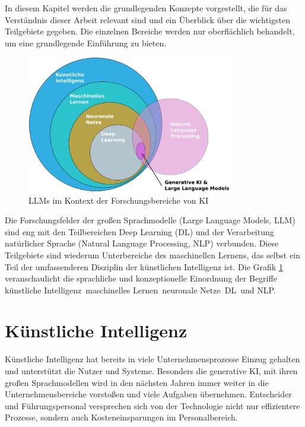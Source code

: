 In diesem Kapitel werden die grundlegenden Konzepte vorgestellt, die für das Verständnis dieser Arbeit relevant sind und ein Überblick über die wichtigsten Teilgebiete gegeben. Die einzelnen Bereiche werden nur oberflächlich behandelt, um eine grundlegende Einführung zu bieten.

\begin{figure}[!ht]
	\includegraphics[width=0.8\textwidth]{content/chapter_basics/images/einordnung_bezeichnungen.eps}
	\centering
	\caption{LLMs im Kontext der Forschungsbereiche von KI}
	\label{img:classification_of_terms}
\end{figure}

Die Forschungsfelder der großen Sprachmodelle (Large Language Models, \acrshort{LLM}) sind eng mit den Teilbereichen Deep Learning (\acrshort{DL}) und der Verarbeitung natürlicher Sprache (Natural Language Processing, \acrshort{NLP}) verbunden. Diese Teilgebiete sind wiederum Unterbereiche des maschinellen Lernens, das selbst ein Teil der umfassenderen Disziplin der künstlichen Intelligenz ist. Die Grafik \ref{img:classification_of_terms} veranschaulicht die sprachliche und konzeptionelle Einordnung der Begriffe \glqq künstliche Intelligenz\grqq \, \glqq maschinelles Lernen\grqq \, \glqq neuronale Netze\grqq \, \glqq DL\grqq \ und \glqq NLP\grqq .



\section{Künstliche Intelligenz}
Künstliche Intelligenz hat bereits in viele Unternehmensprozesse Einzug gehalten und unterstützt die Nutzer und Systeme. Besonders die generative KI, mit ihren großen Sprachmodellen wird in den nächsten Jahren immer weiter in die Unternehmensbereiche vorstoßen und viele Aufgaben übernehmen. Entscheider und Führungspersonal versprechen sich von der Technologie nicht nur effizientere Prozesse, sondern auch Kosteneinsparungen im Personalbereich.\vspace{0.2cm}

